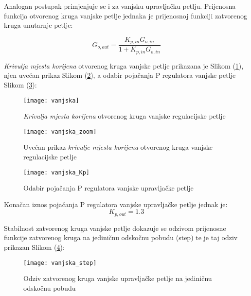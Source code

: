 \documentclass[11pt,a4paper]{article}
\begin{document}
Analogan postupak primjenjuje se i za vanjsku upravljačku petlju. Prijenosna funkcija otvorenog kruga vanjske petlje jednaka je prijenosnoj funkciji zatvorenog kruga unutarnje petlje:

\begin{equation}
G_{o,out} = \frac{K_{p,in}G_{o,in}}{1 + K_{p,in}G_{o,in}}
\label{eq:tf2}
\end{equation}

\textit{Krivulja mjesta korijena} otvorenog kruga vanjske petlje prikazana je Slikom (\ref{fig:KMK_out}), njen uvećan prikaz Slikom (\ref{fig:KMK_out_zoom}), a odabir pojačanja P regulatora vanjske petlje Slikom (\ref{fig:vanjska_Kp}):

\begin{figure}[H]
	\centering
	\texttt{[image: vanjska]}
	\caption{\textit{Krivulja mjesta korijena} otvorenog kruga vanjske regulacijske petlje}
	\label{fig:KMK_out}
\end{figure}

\begin{figure}[H]
	\centering
	\texttt{[image: vanjska\_zoom]}
	\caption{Uvećan prikaz \textit{krivulje mjesta korijena} otvorenog kruga vanjske regulacijske petlje}
	\label{fig:KMK_out_zoom}
\end{figure}

\begin{figure}[H]
	\centering
	\texttt{[image: vanjska\_Kp]}
	\caption{Odabir pojačanja P regulatora vanjske upravljačke petlje}
	\label{fig:vanjska_Kp}
\end{figure}

\newpage
Konačan iznos pojačanja P regulatora vanjske upravljačke petlje jednak je:
 \begin{equation}
 \boxed{
 K_{p,out} = 1.3
 }
 \label{eq:Kp_in}
 \end{equation}

Stabilnost zatvorenog kruga vanjske petlje dokazuje se odzivom prijenosne funkcije zatvorenog kruga na jediničnu odskočnu pobudu (step) te je taj odziv prikazan Slikom (\ref{fig:step2}):

\begin{figure}[H]
	\centering
	\texttt{[image: vanjska\_step]}
	\caption{Odziv zatvorenog kruga vanjske upravljačke petlje na jediničnu odskočnu pobudu}
	\label{fig:step2}
\end{figure}
\end{document}

